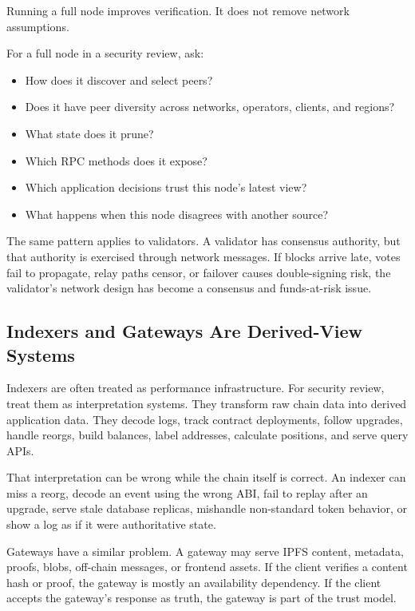 Running a full node improves verification. It does not remove network assumptions.

For a full node in a security review, ask:

\begin{itemize}
\item How does it discover and select peers?
\item Does it have peer diversity across networks, operators, clients, and regions?
\item What state does it prune?
\item Which RPC methods does it expose?
\item Which application decisions trust this node's latest view?
\item What happens when this node disagrees with another source?
\end{itemize}

The same pattern applies to validators. A validator has consensus authority, but that authority is exercised through network messages. If blocks arrive late, votes fail to propagate, relay paths censor, or failover causes double-signing risk, the validator's network design has become a consensus and funds-at-risk issue.

\subsection{Indexers and Gateways Are Derived-View Systems}

Indexers are often treated as performance infrastructure. For security review, treat them as interpretation systems. They transform raw chain data into derived application data. They decode logs, track contract deployments, follow upgrades, handle reorgs, build balances, label addresses, calculate positions, and serve query APIs.

That interpretation can be wrong while the chain itself is correct. An indexer can miss a reorg, decode an event using the wrong ABI, fail to replay after an upgrade, serve stale database replicas, mishandle non-standard token behavior, or show a log as if it were authoritative state.

Gateways have a similar problem. A gateway may serve IPFS content, metadata, proofs, blobs, off-chain messages, or frontend assets. If the client verifies a content hash or proof, the gateway is mostly an availability dependency. If the client accepts the gateway's response as truth, the gateway is part of the trust model.

